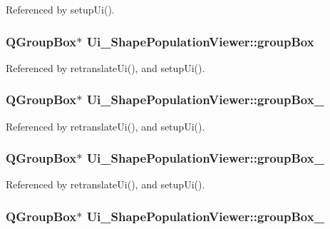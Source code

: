 Referenced by setup\-Ui().

\hypertarget{class_ui___shape_population_viewer_a122d88319567bbd1facdaaca34b2f202}{
\subsubsection[{group\-Box}]{\setlength{\rightskip}{0pt plus 5cm}Q\-Group\-Box$\ast$ Ui\-\_\-\-Shape\-Population\-Viewer\-::group\-Box}}\label{class_ui___shape_population_viewer_a122d88319567bbd1facdaaca34b2f202}


Referenced by retranslate\-Ui(), and setup\-Ui().

\hypertarget{class_ui___shape_population_viewer_ad16b63d2018a2ebb705ff5be049f1f8e}{
\subsubsection[{group\-Box\-\_\-4}]{\setlength{\rightskip}{0pt plus 5cm}Q\-Group\-Box$\ast$ Ui\-\_\-\-Shape\-Population\-Viewer\-::group\-Box\-\_}}\label{class_ui___shape_population_viewer_ad16b63d2018a2ebb705ff5be049f1f8e}


Referenced by retranslate\-Ui(), and setup\-Ui().

\hypertarget{class_ui___shape_population_viewer_a645bc1a3805b989bfb60fdd4835c88d6}{
\subsubsection[{group\-Box\-\_\-5}]{\setlength{\rightskip}{0pt plus 5cm}Q\-Group\-Box$\ast$ Ui\-\_\-\-Shape\-Population\-Viewer\-::group\-Box\-\_}}\label{class_ui___shape_population_viewer_a645bc1a3805b989bfb60fdd4835c88d6}


Referenced by retranslate\-Ui(), and setup\-Ui().

\hypertarget{class_ui___shape_population_viewer_af5e228584a01908bc1c03518e524637c}{
\subsubsection[{group\-Box\-\_\-6}]{\setlength{\rightskip}{0pt plus 5cm}Q\-Group\-Box$\ast$ Ui\-\_\-\-Shape\-Population\-Viewer\-::group\-Box\-\_}}\label{class_ui___shape_population_viewer_af5e228584a01908bc1c03518e524637c}


